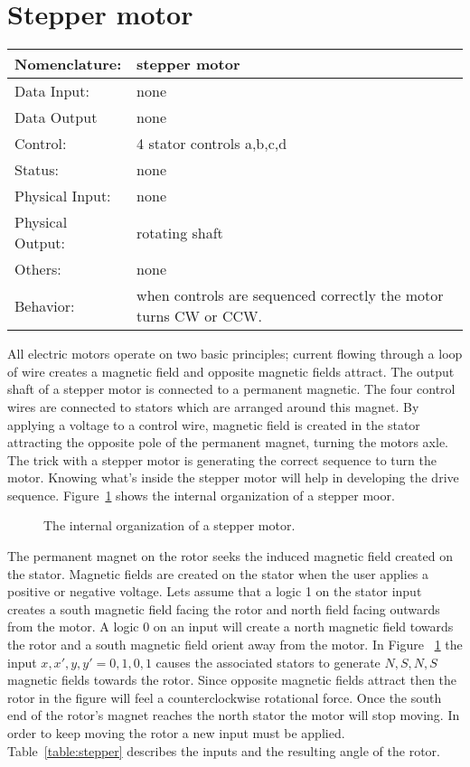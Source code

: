 \section{Stepper motor}
\label{page:stepper}
\begin{tabular}{|l|p{3.5in}|} \hline
Nomenclature:  & stepper motor \\ \hline
Data Input:    & none     \\ \hline
Data Output    & none    \\ \hline
Control:       & 4 stator controls a,b,c,d  \\ \hline
Status:        & none                                   \\ \hline
Physical Input:& none		\\ \hline
Physical Output:& rotating shaft \\ \hline
Others:        & none                   \\ \hline
Behavior:      & when controls are sequenced correctly the
motor turns CW or CCW. \\ \hline
\end{tabular}

All electric motors operate on two basic principles; 
current flowing through a loop of wire creates a magnetic
field and opposite magnetic fields attract.  
The output shaft of a stepper motor is connected to a permanent
magnetic.  The four control wires are connected to stators which
are arranged around this magnet.  By applying a voltage to a 
control wire, magnetic field is created in the stator 
attracting the opposite pole of the permanent magnet, turning 
the motors axle.  The trick with a stepper motor is generating
the correct sequence to turn the motor.  Knowing what's inside
the stepper motor will help in developing the drive sequence.  
Figure~\ref{fig:commonPeripheralComponentsstepper} shows the internal organization of a
stepper moor.

\begin{figure}[ht]
\caption{The internal organization of a stepper motor.}
\label{fig:commonPeripheralComponentsstepper}
\end{figure}

The permanent magnet on the rotor seeks the induced magnetic field
created on the stator.  Magnetic fields are created on the stator
when the user applies a positive or negative voltage.  Lets assume
that a logic 1 on the stator input creates a south magnetic field facing the rotor
and north field facing outwards from the motor.  A logic 0 on an input
will create a north magnetic field towards the rotor and a south magnetic
field orient away from the motor.  In Figure ~\ref{fig:commonPeripheralComponentsstepper} 
the input $x,x',y,y' = 0,1,0,1$ causes the associated stators to generate
$N,S,N,S$ magnetic fields towards the rotor.  Since opposite magnetic
fields attract then the rotor in the figure will feel a counterclockwise 
rotational force.  Once the south end of the rotor's magnet reaches the
north stator the motor will stop moving.  In order to keep moving
the rotor a new input must be applied.  Table~\ref{table:stepper}
describes the inputs and the resulting angle of the rotor.

